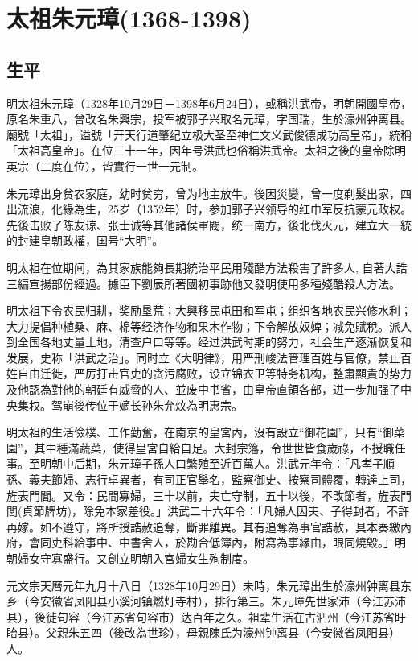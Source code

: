 
\section{太祖朱元璋\tiny(1368-1398)}

\subsection{生平}

明太祖朱元璋（1328年10月29日－1398年6月24日），或稱洪武帝，明朝開國皇帝，原名朱重八，曾改名朱興宗，投军被郭子兴取名元璋，字国瑞，生於濠州钟离县。廟號「太祖」，谥號「开天行道肇纪立极大圣至神仁文义武俊德成功高皇帝」，統稱「太祖高皇帝」。在位三十一年，因年号洪武也俗稱洪武帝。太祖之後的皇帝除明英宗（二度在位），皆實行一世一元制。

朱元璋出身贫农家庭，幼时贫穷，曾为地主放牛。後因災變，曾一度剃髮出家，四出流浪，化緣為生，25岁（1352年）时，参加郭子兴领导的红巾军反抗蒙元政权。先後击败了陈友谅、张士诚等其他諸侯軍閥，统一南方，後北伐灭元，建立大一統的封建皇朝政權，国号“大明”。

明太祖在位期间，為其家族能夠長期統治平民用殘酷方法殺害了許多人, 自著大誥三編宣揚部份經過。據臣下劉辰所著國初事跡他又發明使用多種殘酷殺人方法。

明太祖下令农民归耕，奖励垦荒；大興移民屯田和军屯；组织各地农民兴修水利；大力提倡种植桑、麻、棉等经济作物和果木作物；下令解放奴婢；减免賦稅。派人到全国各地丈量土地，清查户口等等。经过洪武时期的努力，社会生产逐渐恢复和发展，史称「洪武之治」。同时立《大明律》，用严刑峻法管理百姓与官僚，禁止百姓自由迁徙，严厉打击官吏的贪污腐败，设立锦衣卫等特务机构，整肅顯貴的势力及他認為對他的朝廷有威脅的人、並废中书省，由皇帝直領各部，进一步加强了中央集权。驾崩後传位于嫡长孙朱允炆為明惠宗。

明太祖的生活儉樸、工作勤奮，在南京的皇宮內，沒有設立“御花園”，只有“御菜園”，其中種滿蔬菜，使得皇宮自給自足。大封宗籓，令世世皆食歲祿，不授職任事。至明朝中后期，朱元璋子孫人口繁殖至近百萬人。洪武元年令：「凡孝子順孫、義夫節婦、志行卓異者，有司正官舉名，監察御史、按察司體覆，轉達上司，旌表門閭。又令：民間寡婦，三十以前，夫亡守制，五十以後，不改節者，旌表門閭(貞節牌坊)，除免本家差役。」洪武二十六年令：「凡婦人因夫、子得封者，不許再嫁。如不遵守，將所授誥赦追奪，斷罪離異。其有追奪為事官誥赦，具本奏繳內府，會同吏科給事中、中書舍人，於勘合低簿內，附寫為事緣由，眼同燒毀。」明朝婦女守寡盛行。又創立明朝入宮婦女生殉制度。

元文宗天曆元年九月十八日（1328年10月29日）未時，朱元璋出生於濠州钟离县东乡（今安徽省凤阳县小溪河镇燃灯寺村），排行第三。朱元璋先世家沛（今江苏沛县），後徙句容（今江苏省句容市）达百年之久。祖辈生活在古泗州（今江苏省盱眙县）。父親朱五四（後改為世珍），母親陳氏为濠州钟离县（今安徽省凤阳县）人。

